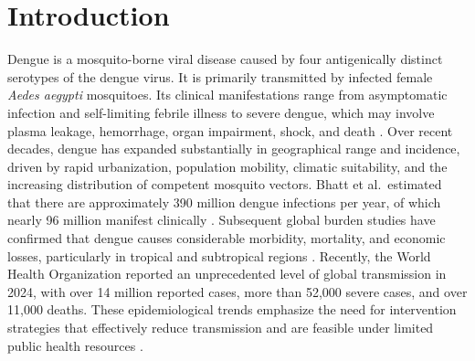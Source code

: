 \documentclass[preprint]{elsarticle}
\begin{document}

\section{Introduction}

Dengue is a mosquito-borne viral disease caused by four antigenically distinct serotypes of the dengue virus. It is primarily transmitted by infected female \textit{Aedes aegypti} mosquitoes. Its clinical manifestations range from asymptomatic infection and self-limiting febrile illness to severe dengue, which may involve plasma leakage, hemorrhage, organ impairment, shock, and death \cite{wilder2019dengue,PazBailey2024Dengue}. Over recent decades, dengue has expanded substantially in geographical range and incidence, driven by rapid urbanization, population mobility, climatic suitability, and the increasing distribution of competent mosquito vectors. Bhatt et al.\ estimated that there are approximately 390 million dengue infections per year, of which nearly 96 million manifest clinically \cite{bhatt2013global}. Subsequent global burden studies have confirmed that dengue causes considerable morbidity, mortality, and economic losses, particularly in tropical and subtropical regions \cite{stanaway2016global,shepard2016global}. Recently, the World Health Organization reported an unprecedented level of global transmission in 2024, with over 14 million reported cases, more than 52,000 severe cases, and over 11,000 deaths. These epidemiological trends emphasize the need for intervention strategies that effectively reduce transmission and are feasible under limited public health resources \cite{mondiale2025dengue,guzman2010dengue}.
\end{document}
